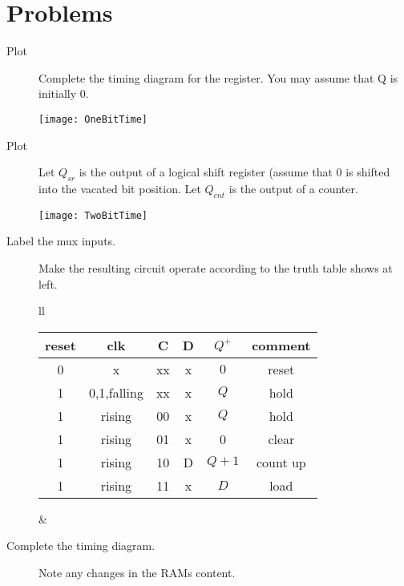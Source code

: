 \section{Problems}
\begin{description}

    \item[Plot] Complete the timing diagram for the register.
        You may assume that Q is initially 0.

        \texttt{[image: OneBitTime]}

    \item[Plot] Let
        $Q_{sr}$ is the output of a logical shift register
        (assume that 0 is shifted into the vacated bit position.
            Let $Q_{cnt}$ is the output of a counter.

            \texttt{[image: TwoBitTime]}

        \item[Label the mux inputs.]
            Make the resulting circuit operate according to the
            truth table shows at left.

            \begin{tabular}{ll}
                \begin{tabular}{c|c|c|c||c||c}
                    reset & clk          & C  & D   & $Q^+$  & comment     \\ \hline
                    0     & x            & xx & x   & $0$    & reset       \\ \hline
                    1     & 0,1,falling  & xx & x   & $Q$    & hold        \\ \hline
                    1     & rising       & 00 & x   & $Q$    & hold        \\ \hline
                    1     & rising       & 01 & x   & 0      & clear       \\ \hline
                    1     & rising       & 10 & D   & $Q+1$  & count up    \\ \hline
                    1     & rising       & 11 & x   & $D$    & load        \\
                \end{tabular}
                &
            \end{tabular}

            \vspace{1cm}

        \item[Complete the timing diagram.]  Note any changes in
            the RAMs content.


\end{description}
